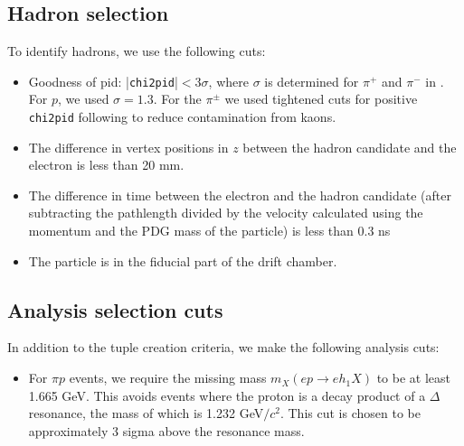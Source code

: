 \subsection{Hadron selection}
\label{sec:hadron_selection}
To identify hadrons, we use the following cuts:
\begin{itemize}
    \item Goodness of pid: |\texttt{chi2pid}|$<3\sigma$, where $\sigma$ is determined for $\pi^+$ and $\pi^-$ in \cite{RGANote}.  For $p$, we used $\sigma=1.3$.  For the $\pi^\pm$ we used tightened cuts for positive \texttt{chi2pid} following \cite{RGANote} to reduce contamination from kaons.
    \item The difference in vertex positions in $z$ between the hadron candidate and the electron is less than 20 mm.  
    \item The difference in time between the electron and the hadron candidate (after subtracting the pathlength divided by the velocity calculated using the momentum and the PDG mass of the particle) is less than 0.3 ns
    \item The particle is in the fiducial part of the drift chamber.  
\end{itemize}

\subsection{Analysis selection cuts}
\label{sec:analysis_selection}
In addition to the tuple creation criteria, we make the following analysis cuts:
\begin{itemize}
    \item For $\pi p$ events, we require the missing mass $m_{X}(ep\rightarrow eh_1X)$ to be at least 1.665 GeV.  This avoids events where the proton is a decay product of a $\Delta$ resonance, the mass of which is 1.232 GeV$/c^2$.  This cut is chosen to be approximately 3 sigma above the resonance mass.  
\end{itemize}